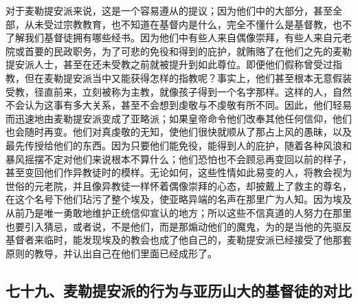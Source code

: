 对于麦勒提安派来说，这是一个容易遵从的提议；因为他们中的大部分，甚至全部，从未受过宗教教育，也不知道在基督内是什么，完全不懂什么是基督教，也不了解我们基督徒拥有哪些经书。因为他们中有些人来自偶像崇拜，有些人来自元老院或首要的民政职务，为了可悲的免役和得到的庇护，就贿赂了在他们之先的麦勒提安派人士，甚至在还未受教之前就被提升到如此尊位。即便他们假称曾受过指教，但在麦勒提安派当中又能获得怎样的指教呢？事实上，他们甚至根本无意假装受教，径直前来，立刻被称为主教，就像孩子得到一个名字那样。这样的人，自然不会认为这事有多大关系，甚至不会想到虔敬与不虔敬有所不同。因此，他们轻易而迅速地由麦勒提安派变成了亚略派；如果皇帝命令他们改奉其他任何信仰，他们也会随时再变。他们对真虔敬的无知，使他们很快就顺从了那占上风的愚昧，以及最先传授给他们的东西。因为只要他们能免役，能得到人的庇护，随着各种风浪和暴风摇摆不定对他们来说根本不算什么；他们恐怕也不会顾忌再变回以前的样子，甚至变回他们作异教徒时的模样。无论如何，这些性情如此易变的人，将教会视为世俗的元老院，并且像异教徒一样怀着偶像崇拜的心态，却披戴上了救主的尊名，在这个名号下他们玷污了整个埃及，使亚略异端的名声在那里广为人知。因为埃及从前乃是唯一勇敢地维护正统信仰宣认的地方；所以这些不信真道的人努力在那里也要引入猜忌，或者说，不是他们，而是那煽动他们的魔鬼，为的是当他的先驱反基督者来临时，能发现埃及的教会也成了他自己的，麦勒提安派已经接受了他那套原则的教导，并认出自己在他们里面已经成形了。\par


\subsection{七十九、麦勒提安派的行为与亚历山大的基督徒的对比}

